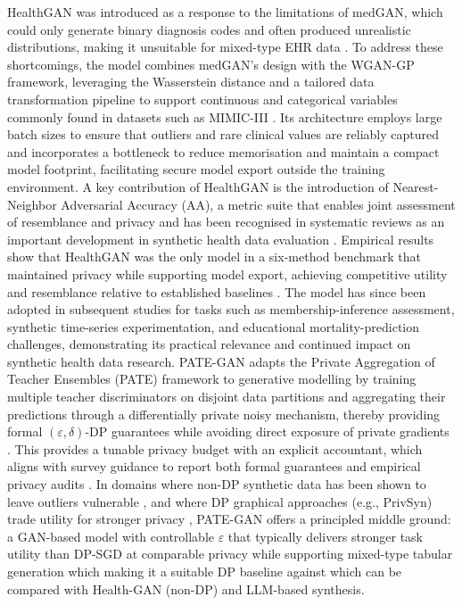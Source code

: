 \documentclass[master,proposal,extern,palatino]{rgseThesis}
\begin{document}
HealthGAN was introduced as a response to the limitations of medGAN, which could only generate binary diagnosis codes and often produced unrealistic distributions, making it unsuitable for mixed-type EHR data \cite{healthgan} \cite{yale2020synthesizing} \cite{bhanot2022investigating}. To address these shortcomings, the model combines medGAN’s design with the WGAN-GP framework, leveraging the Wasserstein distance and a tailored data transformation pipeline to support continuous and categorical variables commonly found in datasets such as MIMIC-III \cite{healthgan}. Its architecture employs large batch sizes to ensure that outliers and rare clinical values are reliably captured and incorporates a bottleneck to reduce memorisation and maintain a compact model footprint, facilitating secure model export outside the training environment. A key contribution of HealthGAN is the introduction of Nearest-Neighbor Adversarial Accuracy (AA), a metric suite that enables joint assessment of resemblance and privacy and has been recognised in systematic reviews as an important development in synthetic health data evaluation \cite{Murtaza2023}. Empirical results show that HealthGAN was the only model in a six-method benchmark that maintained privacy while supporting model export, achieving competitive utility and resemblance relative to established baselines \cite{healthgan}. The model has since been adopted in subsequent studies for tasks such as membership-inference assessment, synthetic time-series experimentation, and educational mortality-prediction challenges, demonstrating its practical relevance and continued impact on synthetic health data research.
\newline
\textsc{PATE{-}GAN} adapts the Private Aggregation of Teacher Ensembles (PATE) framework to generative modelling by training multiple teacher discriminators on disjoint data partitions and aggregating their predictions through a differentially private noisy mechanism, thereby providing formal $(\varepsilon,\delta)$-DP guarantees while avoiding direct exposure of private gradients \cite{pategan}. This provides a tunable privacy budget with an explicit accountant, which aligns with survey guidance to report both formal guarantees and empirical privacy audits \cite{hernandez2022synthetic,Murtaza2023}. In domains where non-DP synthetic data has been shown to leave outliers vulnerable \cite{stadler2022synthetic}, and where DP graphical approaches (e.g., PrivSyn) trade utility for stronger privacy \cite{privsyn2021}, \textsc{PATE{-}GAN} offers a principled middle ground: a GAN-based model with controllable $\varepsilon$ that typically delivers stronger task utility than DP-SGD at comparable privacy while supporting mixed-type tabular generation which making it a suitable DP baseline against which can be compared with Health-GAN (non-DP) and LLM-based synthesis.
\end{document}
